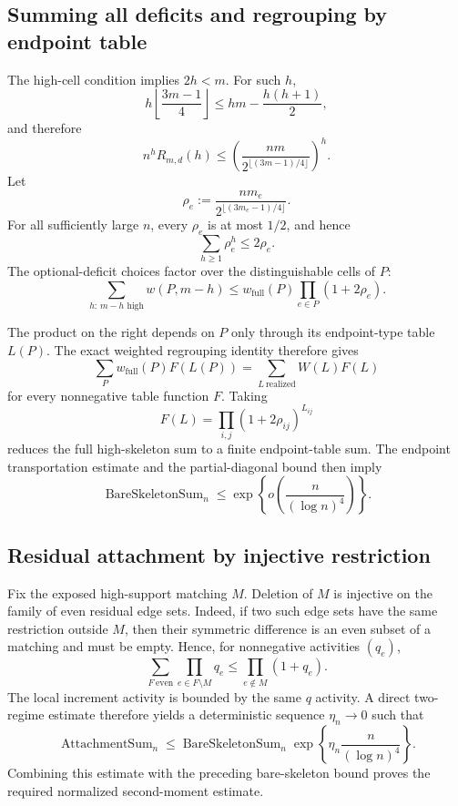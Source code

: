 \subsection{Summing all deficits and regrouping by endpoint table}

The high-cell condition implies $2h<m$.  For such $h$,
\[
  h\left\lfloor\frac{3m-1}{4}\right\rfloor
  \le
  hm-\frac{h(h+1)}2,
\]
and therefore
\[
  n^hR_{m,d}(h)
  \le
  \left(
    \frac{nm}{2^{\lfloor(3m-1)/4\rfloor}}
  \right)^h.
\]
Let
\[
  \rho_e:=
  \frac{nm_e}{2^{\lfloor(3m_e-1)/4\rfloor}}.
\]
For all sufficiently large $n$, every $\rho_e$ is at most $1/2$, and hence
\[
  \sum_{h\ge 1}\rho_e^h
  \le 2\rho_e.
\]
The optional-deficit choices factor over the distinguishable cells of $P$:
\[
  \sum_{h:\,m-h\text{ high}}w(P,m-h)
  \le
  w_{\mathrm{full}}(P)
  \prod_{e\in P}(1+2\rho_e).
\]

The product on the right depends on $P$ only through its endpoint-type table
$L(P)$.  The exact weighted regrouping identity therefore gives
\[
  \sum_P w_{\mathrm{full}}(P)F(L(P))
  =
  \sum_{L\ \mathrm{realized}}W(L)F(L)
\]
for every nonnegative table function $F$.  Taking
\[
  F(L)=
  \prod_{i,j}(1+2\rho_{ij})^{L_{ij}}
\]
reduces the full high-skeleton sum to a finite endpoint-table sum.  The endpoint
transportation estimate and the partial-diagonal bound then imply
\[
  \operatorname{BareSkeletonSum}_n
  \le
  \exp\!\left\{
    o\!\left(\frac{n}{(\log n)^4}\right)
  \right\}.
\]

\subsection{Residual attachment by injective restriction}

Fix the exposed high-support matching $M$.  Deletion of $M$ is injective on the
family of even residual edge sets.  Indeed, if two such edge sets have the same
restriction outside $M$, then their symmetric difference is an even subset of
a matching and must be empty.  Hence, for nonnegative activities $(q_e)$,
\[
  \sum_{F\ \mathrm{even}}
    \prod_{e\in F\setminus M}q_e
  \le
  \prod_{e\notin M}(1+q_e).
\]
The local increment activity is bounded by the same $q$ activity.  A direct
two-regime estimate therefore yields a deterministic sequence
$\eta_n\to0$ such that
\[
  \operatorname{AttachmentSum}_n
  \le
  \operatorname{BareSkeletonSum}_n
  \exp\!\left\{
    \eta_n\frac{n}{(\log n)^4}
  \right\}.
\]
Combining this estimate with the preceding bare-skeleton bound proves the
required normalized second-moment estimate.

